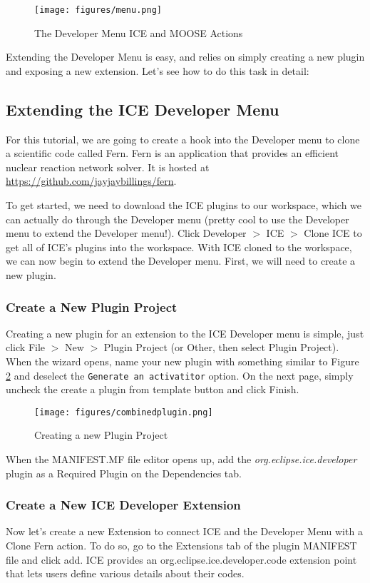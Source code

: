 \begin{figure}[h]
\texttt{[image: figures/menu.png]}
\caption{The Developer Menu ICE and MOOSE Actions}
\label{fig:devcloneice}
\end{figure}

Extending the Developer Menu is easy, and relies on simply creating a new plugin
and exposing a new extension. Let's see how to do this task in detail:

\subsection*{Extending the ICE Developer Menu}
For this tutorial, we are going to create a hook into the Developer menu to
clone a scientific code called Fern. Fern is an application that provides an
efficient nuclear reaction network solver. It is hosted at
\url{https://github.com/jayjaybillings/fern}. 

To get started, we need to download the ICE plugins to our workspace, which we
can actually do through the Developer menu (pretty cool to use the Developer 
menu to extend the Developer menu!). Click Developer $>$ ICE $>$ Clone ICE to 
get all of ICE's plugins into the workspace. With ICE cloned to the workspace, 
we can now begin to extend the Developer menu. First, we will need to create a
new plugin. 

\subsubsection*{Create a New Plugin Project}
Creating a new plugin for an extension to the ICE Developer menu is simple, just
click File $>$ New $>$ Plugin Project (or Other, then select Plugin Project).
When the wizard opens, name your new plugin with something similar to Figure
\ref{fig:newplugin} and deselect the \texttt{Generate an activatitor} option. On
the next page, simply uncheck the create a plugin from template button and click Finish. 
\begin{figure}[h]
\texttt{[image: figures/combinedplugin.png]}
\caption{Creating a new Plugin Project}
\label{fig:newplugin}
\end{figure}

When the MANIFEST.MF file editor opens up, add the
\emph{org.eclipse.ice.developer} plugin as a Required Plugin on the Dependencies
tab.

\subsubsection*{Create a New ICE Developer Extension}
Now let's create a new Extension to connect ICE and the Developer Menu
with a Clone Fern action. To do so, go to the Extensions tab of the
plugin MANIFEST file and click add. ICE provides an
org.eclipse.ice.developer.code extension point that lets users define various
details about their codes. 

